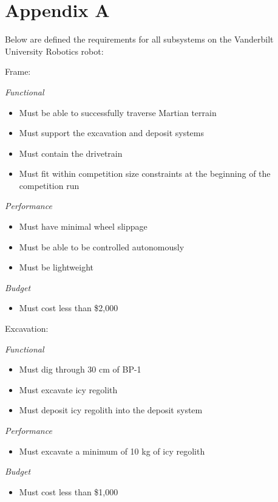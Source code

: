 \documentclass[class=article, crop=false]{standalone}
\begin{document}
\newpage
\section{Appendix A}

\noindent
\Large Below are defined the requirements for all subsystems on the Vanderbilt University Robotics robot: \vspace*{0.1in}


\noindent
\normalsize
Frame:
\footnotesize

\vspace*{0.05in}
\noindent
\emph{Functional}
\begin{itemize}
 \item Must be able to successfully traverse Martian terrain
 \item Must support the excavation and deposit systems
 \item Must contain the drivetrain
 \item Must fit within competition size constraints at the beginning of the competition run
\end{itemize}
\noindent
\emph{Performance}
\begin{itemize}
 \item Must have minimal wheel slippage
 \item Must be able to be controlled autonomously
 \item Must be lightweight
\end{itemize}
\noindent
\emph{Budget}
\begin{itemize}
 \item Must cost less than \$2,000
\end{itemize}
\vspace*{0.1in}


\noindent
\normalsize
Excavation:
\footnotesize

\vspace*{0.05in}
\noindent
\emph{Functional}
\begin{itemize}
 \item Must dig through 30 cm of BP-1
 \item Must excavate icy regolith 
 \item Must deposit icy regolith into the deposit system
\end{itemize}
\noindent
\emph{Performance}
\begin{itemize}
 \item Must excavate a minimum of 10 kg of icy regolith
\end{itemize}
\noindent
\emph{Budget}
\begin{itemize}
 \item Must cost less than \$1,000
\end{itemize}
\end{document}
